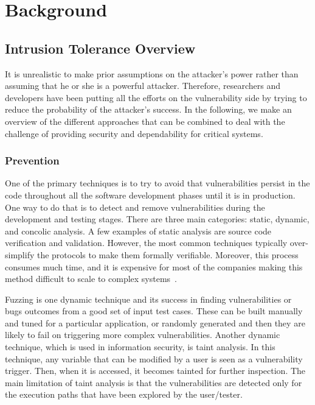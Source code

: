\chapter{Background}
\label{chap:related_work}


\section{Intrusion Tolerance Overview}

It is unrealistic to make prior assumptions on the attacker's power rather than assuming that he or she is a powerful attacker.
Therefore, researchers and developers have been putting all the efforts on the vulnerability side by trying to reduce the probability of the attacker's success. 
In the following, we make an overview of the different approaches that can be combined to deal with the challenge of providing security and dependability for critical systems.

\subsection*{Prevention}
One of the primary techniques is to try to avoid that vulnerabilities persist in the code throughout all the software development phases until it is in production. 
One way to do that is to detect and remove vulnerabilities during the development and testing stages.
There are three main categories: static, dynamic, and concolic analysis.
A few examples of static analysis are source code verification and validation. 
However, the most common techniques typically over-simplify the protocols to make them formally verifiable. 
Moreover, this process consumes much time, and it is expensive for most of the companies making this method difficult to scale to complex systems~\cite{Giuffrida:2013}.

Fuzzing is one dynamic technique and its success in finding vulnerabilities or bugs outcomes from a good set of input test cases.
These can be built manually and tuned for a particular application, or randomly generated and then they are likely to fail on triggering more complex vulnerabilities.
Another dynamic technique, which is used in information security, is taint analysis.
In this technique, any variable that can be modified by a user is seen as a vulnerability trigger. 
Then, when it is accessed, it becomes tainted for further inspection.
The main limitation of taint analysis is that the vulnerabilities are detected only for the execution paths that have been explored by the user/tester.

